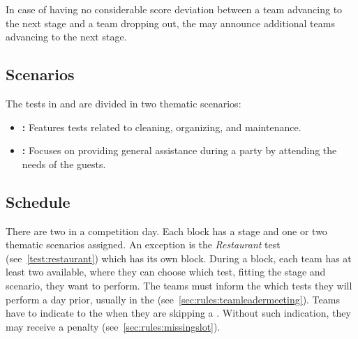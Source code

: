 \noindent In case of having no considerable score deviation between a team advancing to the next stage and a team dropping out, the \TC{} may announce additional teams advancing to the next stage.

\subsection{Scenarios}
\label{sec:rules:scenarios}
The tests in \SONE{} and \STWO{} are divided in two thematic scenarios:
\begin{itemize}
	\item \textbf{\Housekeeper{}:} Features tests related to cleaning, organizing, and maintenance.
	
	\item \textbf{\Partyhost{}:} Focuses on providing general assistance during a party by attending the needs of the guests.
\end{itemize}


\subsection{Schedule}
\label{sec:rules:schedule}
There are two \Testblocks{} in a competition day. Each block has a stage and one or two thematic scenarios assigned. An exception is the \emph{Restaurant} test (see~\ref{test:restaurant}) which has its own block. During a block, each team has at least two \Testslots{} available, where they can choose which test, fitting the stage and scenario, they want to perform. The teams must inform the \OC{} which tests they will perform a day prior, usually in the \TLM{} (see~\ref{sec:rules:teamleadermeeting}). Teams have to indicate to the  when they are skipping a \Testslot{}. Without such indication, they may receive a penalty (see~\ref{sec:rules:missingslot}).

